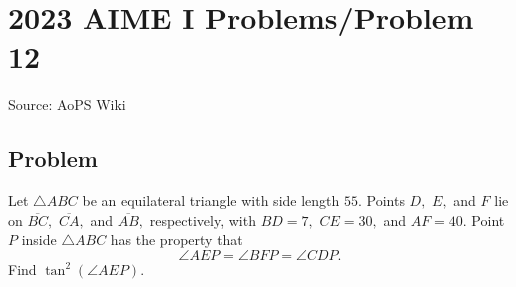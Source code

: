 \documentclass[12pt]{article}
\begin{document}
\section*{{2023 AIME I Problems/Problem 12}}
Source: AoPS Wiki

\subsection*{Problem}
Let $\triangle ABC$ be an equilateral triangle with side length $55.$ Points $D,$ $E,$ and $F$ lie on $\overline{BC},$ $\overline{CA},$ and $\overline{AB},$ respectively, with $BD = 7,$ $CE=30,$ and $AF=40.$ Point $P$ inside $\triangle ABC$ has the property that \[\angle AEP = \angle BFP = \angle CDP.\] Find $\tan^2(\angle AEP).$
\end{document}
